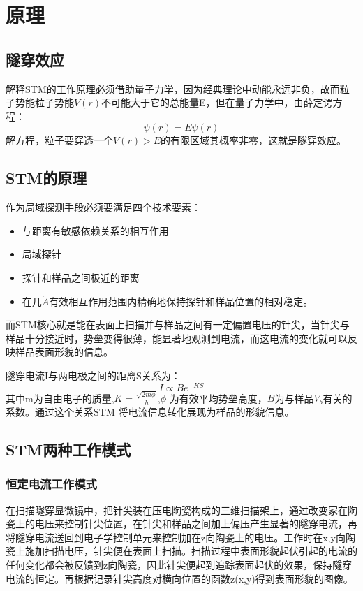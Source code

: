 \documentclass[aps,pre,12pt,preprint,onecolumn,showpacs,showkeys]{revtex4-1}
\begin{document}
\section{原理}
\subsection{隧穿效应}
解释STM的工作原理必须借助量子力学，因为经典理论中动能永远非负，故而粒子势能粒子势能$V(r)$不可能大于它的总能量E，但在量子力学中，由薛定谔方程：
\begin{equation}
[-\frac{\hbar^2}{2m}\nabla^2+V(r)]\psi(r)=E\psi(r)
\end{equation}
解方程，粒子要穿透一个$V(r)>E$的有限区域其概率非零，这就是隧穿效应。
\subsection{STM的原理}
作为局域探测手段必须要满足四个技术要素：
\begin{itemize}
\item 与距离有敏感依赖关系的相互作用
\item 局域探针
\item 探针和样品之间极近的距离
\item 在几$\mathring{A}$有效相互作用范围内精确地保持探针和样品位置的相对稳定。
\end{itemize}
\par 而STM核心就是能在表面上扫描并与样品之间有一定偏置电压的针尖，当针尖与样品十分接近时，势垒变得很薄，能显著地观测到电流，而这电流的变化就可以反映样品表面形貌的信息。\par
隧穿电流I与两电极之间的距离S关系为：
\begin{equation}
I\propto Be^{-KS}
\end{equation}
其中m为自由电子的质量,$K=\frac{\sqrt{2m\phi}}{h}$,$\phi$ 为有效平均势垒高度，$B$为与样品$V_b$有关的系数。通过这个关系STM 将电流信息转化展现为样品的形貌信息。\par

\subsection{STM两种工作模式}
\subsubsection{恒定电流工作模式}
在扫描隧穿显微镜中，把针尖装在压电陶瓷构成的三维扫描架上，通过改变家在陶瓷上的电压来控制针尖位置，在针尖和样品之间加上偏压产生显著的隧穿电流，再将隧穿电流送回到电子学控制单元来控制加在z向陶瓷上的电压。工作时在x,y向陶瓷上施加扫描电压，针尖便在表面上扫描。扫描过程中表面形貌起伏引起的电流的任何变化都会被反馈到z向陶瓷，因此针尖便起到追踪表面起伏的效果，保持隧穿电流的恒定。再根据记录针尖高度对横向位置的函数z(x,y)得到表面形貌的图像。
\end{document}
